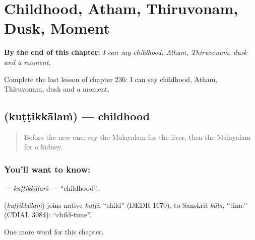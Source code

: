 
\chapter{Childhood, Atham, Thiruvonam, Dusk, Moment}
\label{ch:ml-childhood-atham-thiruvonam-dusk-moment}

\begin{chapteropening}
\textbf{By the end of this chapter:} \emph{I can say childhood, Atham, Thiruvonam, dusk and a moment.}

Complete the last lesson of chapter 236: I can say childhood, Atham, Thiruvonam, dusk and a moment.
\end{chapteropening}

\section[\texorpdfstring{\ml{കുട്ടിക്കാലം} (kuṭṭikkālaṁ)}{കുട്ടിക്കാലം (kuṭṭikkālaṁ)}]{ (kuṭṭikkālaṁ) — childhood}

\label{lesson:ML-C236-kuttikkalam}



\begin{quote}
Before the new one: say the Malayalam for the liver, then the Malayalam for a kidney.
\end{quote}

\subsection*{You'll want to know: }
\textbf{} — \emph{kuṭṭikkālaṁ} — \textquotedblleft{}childhood\textquotedblright{}.

\begin{cousinweb}
\textbf{} (\emph{kuṭṭikkālaṁ}) joins native \emph{kuṭṭi}, \textquotedblleft{}child\textquotedblright{} (DEDR 1670), to Sanskrit \emph{kāla}, \textquotedblleft{}time\textquotedblright{} (CDIAL 3084): \textquotedblleft{}child-time\textquotedblright{}.
\end{cousinweb}

\begin{grammarlens}[title={What you've built}]
One more word for this chapter.
\end{grammarlens}

